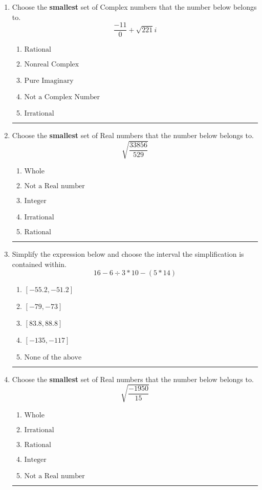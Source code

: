 \documentclass[14pt]{extbook}
\newcommand{\litem}[1]{\item#1\hspace*{-1cm}\rule{\textwidth}{0.4pt}}
\begin{document}
\begin{enumerate}
{\begin{enumerate}[label=\Alph*.]
\end{enumerate} }
\litem{
Choose the \textbf{smallest} set of Complex numbers that the number below belongs to.\[ \frac{-11}{0}+\sqrt{221} i \]\begin{enumerate}[label=\Alph*.]
\item \( \text{Rational} \)
\item \( \text{Nonreal Complex} \)
\item \( \text{Pure Imaginary} \)
\item \( \text{Not a Complex Number} \)
\item \( \text{Irrational} \)

\end{enumerate} }
\litem{
Choose the \textbf{smallest} set of Real numbers that the number below belongs to.\[ \sqrt{\frac{33856}{529}} \]\begin{enumerate}[label=\Alph*.]
\item \( \text{Whole} \)
\item \( \text{Not a Real number} \)
\item \( \text{Integer} \)
\item \( \text{Irrational} \)
\item \( \text{Rational} \)

\end{enumerate} }
\litem{
Simplify the expression below and choose the interval the simplification is contained within.\[ 16 - 6 \div 3 * 10 - (5 * 14) \]\begin{enumerate}[label=\Alph*.]
\item \( [-55.2, -51.2] \)
\item \( [-79, -73] \)
\item \( [83.8, 88.8] \)
\item \( [-135, -117] \)
\item \( \text{None of the above} \)

\end{enumerate} }
\litem{
Choose the \textbf{smallest} set of Real numbers that the number below belongs to.\[ \sqrt{\frac{-1950}{15}} \]\begin{enumerate}[label=\Alph*.]
\item \( \text{Whole} \)
\item \( \text{Irrational} \)
\item \( \text{Rational} \)
\item \( \text{Integer} \)
\item \( \text{Not a Real number} \)


\end{enumerate}}
\end{enumerate}
\end{document}
